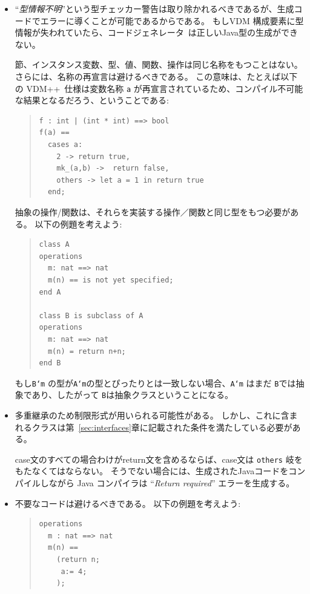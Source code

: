 \documentclass[\pformat,11pt]{jarticle}
\newcommand{\Tcg}{コードジェネレータ}
\newcommand{\VDM}{VDM++}
\begin{document}
\begin{itemize}
\item ``{\em 型情報不明}''という型チェッカー警告は取り除かれるべきであるが、生成コードでエラーに導くことが可能であるからである。
もしVDM 構成要素に型情報が失われていたら、\Tcg\ は正しいJava型の生成ができない。

節、インスタンス変数、型、値、関数、操作は同じ名称をもつことはない。
さらには、名称の再宣言は避けるべきである。
この意味は、たとえば以下の \VDM\ 仕様は変数名称 {\tt a} が再宣言されているため、コンパイル不可能な結果となるだろう、ということである:

\begin{quote}
\begin{small}
\begin{verbatim}
f : int | (int * int) ==> bool
f(a) ==
  cases a:
    2 -> return true,
    mk_(a,b) ->  return false,
    others -> let a = 1 in return true
  end;
\end{verbatim}
\end{small}
\end{quote}

抽象の操作/関数は、それらを実装する操作／関数と同じ型をもつ必要がある。
以下の例題を考えよう:
\begin{quote}
\begin{small}
\begin{verbatim}
class A
operations
  m: nat ==> nat
  m(n) == is not yet specified;
end A

class B is subclass of A
operations
  m: nat ==> nat
  m(n) = return n+n;
end B
\end{verbatim}
\end{small}
\end{quote}
もし\texttt{B`m} の型が\texttt{A`m}の型とぴったりとは一致しない場合、\texttt{A`m} はまだ \texttt{B}では抽象であり、したがって \texttt{B}は抽象クラスということになる。

\item 多重継承のため制限形式が用いられる可能性がある。
しかし、これに含まれるクラスは第~\ref{sec:interfaces}章に記載された条件を満たしている必要がある。

case文のすべての場合わけがreturn文を含めるならば、case文は {\tt others} 岐をもたなくてはならない。
そうでない場合には、生成されたJavaコードをコンパイルしながら Java コンパイラは ``{\em Return required}'' エラーを生成する。
\item 不要なコードは避けるべきである。
以下の例題を考えよう:

\begin{quote}
\begin{small}
\begin{verbatim}
operations
  m : nat ==> nat
  m(n) ==
    (return n;
     a:= 4;
    );
\end{verbatim}
\end{small}
\end{quote}


\end{itemize}
\end{document}
